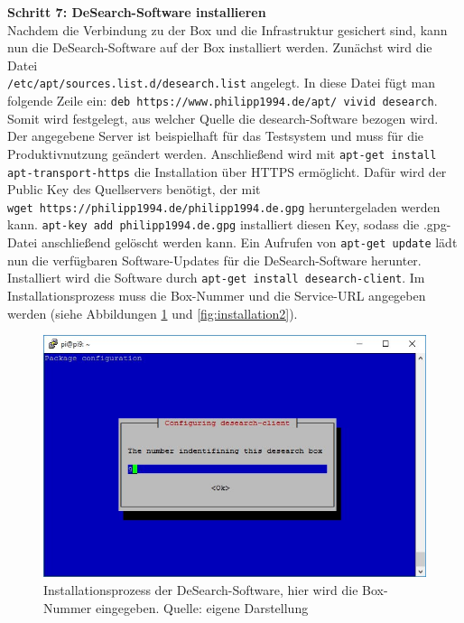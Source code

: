 \textbf{Schritt 7: DeSearch-Software installieren}\\
Nachdem die Verbindung zu der Box und die Infrastruktur gesichert sind, kann nun die DeSearch-Software auf der Box installiert werden. Zunächst wird die Datei\\ \texttt{/etc/apt/sources.list.d/desearch.list} angelegt. In diese Datei fügt man folgende Zeile ein: \texttt{deb https://www.philipp1994.de/apt/ vivid desearch}. Somit wird festgelegt, aus welcher Quelle die desearch-Software bezogen wird. Der angegebene Server ist beispielhaft für das Testsystem und muss für die Produktivnutzung geändert werden. Anschließend wird mit \texttt{apt-get install apt-transport-https} die Installation über HTTPS ermöglicht. Dafür wird der Public Key des Quellservers benötigt, der mit\\ \texttt{wget https://philipp1994.de/philipp1994.de.gpg} heruntergeladen werden kann. \texttt{apt-key add philipp1994.de.gpg} installiert diesen Key, sodass die .gpg-Datei anschließend gelöscht werden kann. Ein Aufrufen von \texttt{apt-get update} lädt nun die verfügbaren Software-Updates für die DeSearch-Software herunter. Installiert wird die Software durch \texttt{apt-get install desearch-client}. Im Installationsprozess muss die Box-Nummer und die Service-URL angegeben werden (siehe Abbildungen \ref{fig:installation1} und \ref{fig:installation2}).
\begin{figure}
	\centering
	\includegraphics[width=\textwidth]{images/installation1}
	\caption[Eingabe der Box-Nummer bei Installation der DeSearch-Software]{Installationsprozess der DeSearch-Software, hier wird die Box-Nummer eingegeben. Quelle: eigene Darstellung}
	\label{fig:installation1}
\end{figure}
